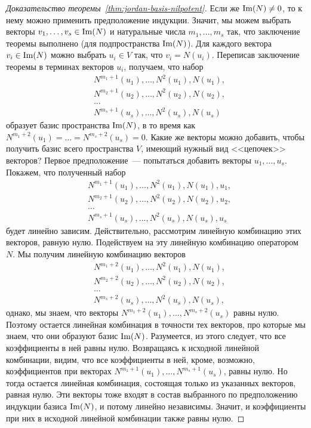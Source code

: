 \begin{proof}[Доказательство теоремы~\ref{thm:jordan-basis-nilpotent}]
Если же $\operatorname{Im}(N)\neq 0$, то к нему можно применить предположение индукции.
Значит, мы можем выбрать векторы $v_1,\dots,v_s\in\operatorname{Im}(N)$ и натуральные числа
$m_1,\dots,m_s$ так, что заключение теоремы выполнено (для подпространства
$\operatorname{Im}(N)$). Для каждого вектора $v_i\in\operatorname{Im}(N)$ можно выбрать
$u_i\in V$ так, что $v_i=N(u_i)$. Переписав заключение теоремы в терминах
векторов $u_i$, получаем, что набор
\begin{align*}
& N^{m_1+1}(u_1),\dots,N^2(u_1),N(u_1), \\
& N^{m_2+1}(u_2),\dots,N^2(u_2),N(u_2), \\
& \dots \\
& N^{m_s+1}(u_s),\dots,N^2(u_s),N(u_s)
\end{align*}
образует базис пространства $\operatorname{Im}(N)$,
в то время как $N^{m_1+2}(u_1) = \dots = N^{m_s+2}(u_s) = 0$.
Какие же векторы можно добавить, чтобы получить базис всего пространства
$V$, имеющий нужный вид <<цепочек>> векторов?
Первое предположение~--- попытаться добавить векторы $u_1,\dots,u_s$.
Покажем, что полученный набор
\begin{align*}
& N^{m_1+1}(u_1),\dots,N^2(u_1),N(u_1),u_1, \\
& N^{m_2+1}(u_2),\dots,N^2(u_2),N(u_2),u_2, \\
& \dots \\
& N^{m_s+1}(u_s),\dots,N^2(u_s),N(u_s),u_s
\end{align*}
будет линейно зависим.
Действительно, рассмотрим линейную комбинацию этих векторов, равную нулю.
Подействуем на эту линейную комбинацию оператором $N$.
Мы получим линейную комбинацию векторов
\begin{align*}
& N^{m_1+2}(u_1),\dots,N^2(u_1),N(u_1), \\
& N^{m_2+2}(u_2),\dots,N^2(u_2),N(u_2), \\
& \dots \\
& N^{m_s+2}(u_s),\dots,N^2(u_s),N(u_s),
\end{align*}
однако, мы знаем, что векторы $N^{m_1+2}(u_1),\dots,N^{m_s+2}(u_s)$
равны нулю. Поэтому остается линейная комбинация в точности тех векторов,
про которые мы знаем, что они образуют базис $\operatorname{Im}(N)$.
Разумеется, из этого следует, что все коэффициенты в ней равны нулю.
Возвращаясь к исходной линейной комбинации, видим, что все коэффициенты
в ней, кроме, возможно, коэффициентов при векторах
$N^{m_1+1}(u_1),\dots,N^{m_s+1}(u_s)$, равны нулю.
Но тогда остается линейная комбинация, состоящая только из указанных
векторов, равная нулю. Эти векторы тоже входят в состав выбранного
по предположению индукции базиса $\operatorname{Im}(N)$, и потому линейно независимы.
Значит, и коэффициенты при них в исходной линейной комбинации также равны нулю.


\end{proof}
